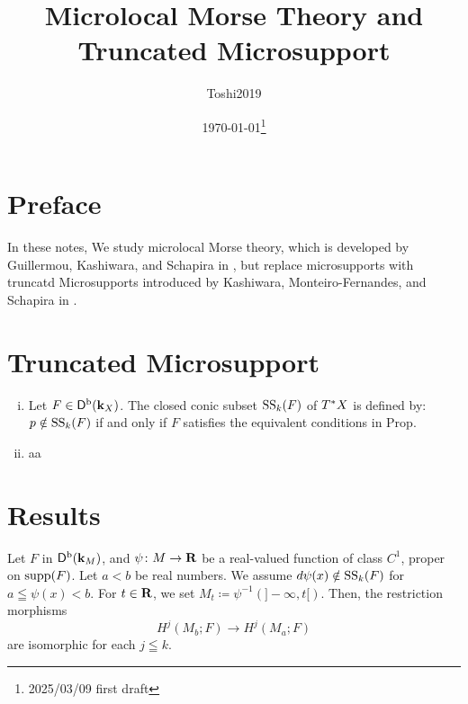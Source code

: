 \title{Microlocal Morse Theory and Truncated Microsupport}
\author{Toshi2019}
\date{\today\footnote{2025/03/09 first draft}}

\maketitle
\section*{Preface}
In these notes, 
We study microlocal Morse theory, which is developed by
Guillermou, Kashiwara, and Schapira in \cite{GKS12}, 
but replace microsupports with
truncatd Microsupports introduced by 
Kashiwara, Monteiro-Fernandes, and Schapira in \cite{KMS03}.

\section{Truncated Microsupport}

\begin{Definition+}
    \begin{enumerate}[(i)]
        \item Let \(F\in\Dompb(\kk_X)\). 
        The closed conic subset \(\muS[k](F)\) of \(\cotb[X]\) 
        is defined by: \(p\notin \muS[k](F)\) 
        if and only if \(F\) satisfies 
        the equivalent conditions in Prop.
        \item aa
    \end{enumerate}
\end{Definition+}

\section{Results}

\begin{Proposition+}
  Let \(F\) in \(\Dompb(\kk_M)\), and 
  \(\psi\colon M\to \rr\) be a real-valued function of 
  class \(C^1\), 
  proper on \(\supp(F)\). 
  Let \(a<b\) be real numbers.
  We assume \(d\psi(x)\notin \muS[k](F)\) for \(
    a\leqq \psi(x)<b
  \). For \(t\in \rr\), we set \(
    M_t\coloneqq\psi^{-1}\left(]-\infty,t[\right)
  \). 
  Then, the restriction morphisms\[
    H^{j}(M_{b};F)\to H^{j}(M_{a};F)
  \]
  are isomorphic for each \(j\leqq k\).
\end{Proposition+}

